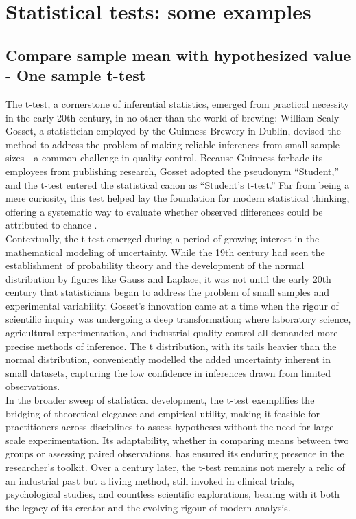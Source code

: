 \documentclass{book}
\begin{document}
\newpage

\section{Statistical tests: some examples}

\subsection{Compare sample mean with hypothesized value - One sample t-test}

The t-test, a cornerstone of inferential statistics, emerged from practical necessity in the early 20th century, in no other than the world of brewing: William Sealy Gosset, a statistician employed by the Guinness Brewery in Dublin, devised the method to address the problem of making reliable inferences from small sample sizes - a common challenge in quality control. Because Guinness forbade its employees from publishing research, Gosset adopted the pseudonym “Student,” and the t-test entered the statistical canon as “Student’s t-test.” Far from being a mere curiosity, this test helped lay the foundation for modern statistical thinking, offering a systematic way to evaluate whether observed differences could be attributed to chance \cite{student1908}.\\

Contextually, the t-test emerged during a period of growing interest in the mathematical modeling of uncertainty. While the 19th century had seen the establishment of probability theory and the development of the normal distribution by figures like Gauss and Laplace, it was not until the early 20th century that statisticians began to address the problem of small samples and experimental variability. Gosset’s innovation came at a time when the rigour of scientific inquiry was undergoing a deep transformation; where laboratory science, agricultural experimentation, and industrial quality control all demanded more precise methods of inference. The t distribution, with its tails heavier than the normal distribution, conveniently modelled the added uncertainty inherent in small datasets, capturing the low confidence in inferences drawn from limited observations.\\

In the broader sweep of statistical development, the t-test exemplifies the bridging of theoretical elegance and empirical utility, making it feasible for practitioners across disciplines to assess hypotheses without the need for large-scale experimentation. Its adaptability, whether in comparing means between two groups or assessing paired observations, has ensured its enduring presence in the researcher’s toolkit. Over a century later, the t-test remains not merely a relic of an industrial past but a living method, still invoked in clinical trials, psychological studies, and countless scientific explorations, bearing with it both the legacy of its creator and the evolving rigour of modern analysis.\\
\end{document}

